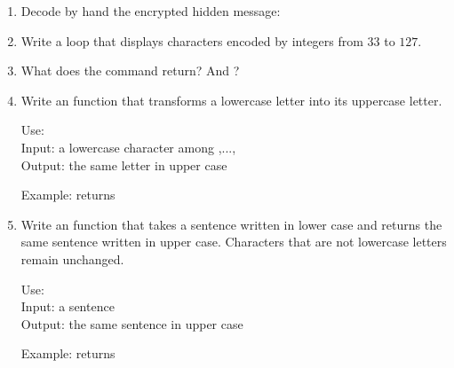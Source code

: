 \documentclass[11pt,class=report,crop=false]{standalone}
\begin{document}

\begin{activite}



\begin{enumerate}
  \item Decode by hand the encrypted hidden message: 

      
  \item Write a loop that displays characters encoded by integers from $33$ to $127$.
  
  \item What does the command   return? And ?
  
  \item Write an  function that transforms a lowercase letter into its uppercase letter.
  
  \begin{fonction}
  
   Use: \\
   Input: a lowercase character among ,...,\\
   Output: the same letter in upper case
  
  \medskip
     
   Example:  returns 
  \end{fonction} 
  
    \item Write an  function that takes a sentence written in lower case and returns the same sentence written in upper case. Characters that are not lowercase letters remain unchanged.
  
  \begin{fonction}[\ci{uppercase()}]
   Use: \\
   Input: a sentence\\
   Output: the same sentence in upper case
  
  \medskip
     
   Example:  returns 
  \end{fonction} 
   

\end{enumerate}
\end{activite}
\end{document}
